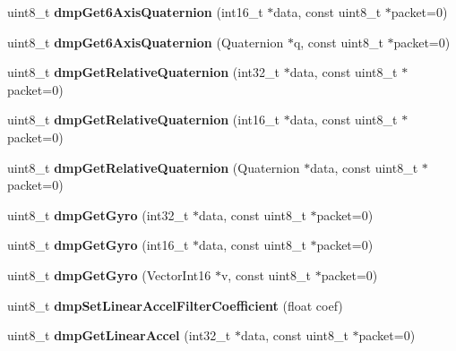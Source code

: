 \begin{DoxyCompactItemize}
uint8\+\_\+t {\bfseries dmp\+Get6\+Axis\+Quaternion} (int16\+\_\+t $\ast$data, const uint8\+\_\+t $\ast$packet=0)
\item 
\mbox{\label{classMPU6050_a2fff9f9904645926472a7527b20d2330}} 
uint8\+\_\+t {\bfseries dmp\+Get6\+Axis\+Quaternion} (Quaternion $\ast$q, const uint8\+\_\+t $\ast$packet=0)
\item 
\mbox{\label{classMPU6050_a355a874853887baea2e8152a218a1358}} 
uint8\+\_\+t {\bfseries dmp\+Get\+Relative\+Quaternion} (int32\+\_\+t $\ast$data, const uint8\+\_\+t $\ast$packet=0)
\item 
\mbox{\label{classMPU6050_ac74ebf94e4504dfe258d8c739d63d807}} 
uint8\+\_\+t {\bfseries dmp\+Get\+Relative\+Quaternion} (int16\+\_\+t $\ast$data, const uint8\+\_\+t $\ast$packet=0)
\item 
\mbox{\label{classMPU6050_ad1b10602a76de6a84365ff2c3e3ee69d}} 
uint8\+\_\+t {\bfseries dmp\+Get\+Relative\+Quaternion} (Quaternion $\ast$data, const uint8\+\_\+t $\ast$packet=0)
\item 
\mbox{\label{classMPU6050_a6625cf6f1ceb2e9c2503a590ade6686b}} 
uint8\+\_\+t {\bfseries dmp\+Get\+Gyro} (int32\+\_\+t $\ast$data, const uint8\+\_\+t $\ast$packet=0)
\item 
\mbox{\label{classMPU6050_a8cb79f053e00eb70b898be131b467748}} 
uint8\+\_\+t {\bfseries dmp\+Get\+Gyro} (int16\+\_\+t $\ast$data, const uint8\+\_\+t $\ast$packet=0)
\item 
\mbox{\label{classMPU6050_a97d9c59f863800ea8d804013d860ba08}} 
uint8\+\_\+t {\bfseries dmp\+Get\+Gyro} (Vector\+Int16 $\ast$v, const uint8\+\_\+t $\ast$packet=0)
\item 
\mbox{\label{classMPU6050_a7142bff552ab1e980cba38f97772eecd}} 
uint8\+\_\+t {\bfseries dmp\+Set\+Linear\+Accel\+Filter\+Coefficient} (float coef)
\item 
\mbox{\label{classMPU6050_aa36d05bce800803489ae4da91f63ed2d}} 
uint8\+\_\+t {\bfseries dmp\+Get\+Linear\+Accel} (int32\+\_\+t $\ast$data, const uint8\+\_\+t $\ast$packet=0)
\item 

\end{DoxyCompactItemize}
